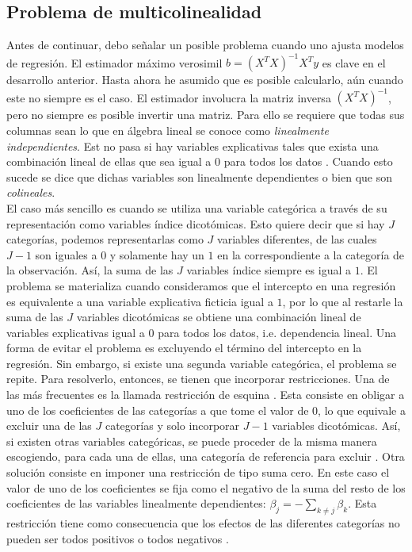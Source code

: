 \subsection{Problema de multicolinealidad}

Antes de continuar, debo señalar un posible problema cuando uno ajusta modelos de regresión. El estimador máximo verosimil $b=(X^TX)^{-1}X^Ty$ es clave en el desarrollo anterior. Hasta ahora he asumido que es posible calcularlo, aún cuando este no siempre es el caso. El estimador involucra la matriz inversa $(X^TX)^{-1}$, pero no siempre es posible invertir una matriz. Para ello se requiere que todas sus columnas sean lo que en álgebra lineal se conoce como \textit{linealmente independientes}. Est no pasa si hay variables explicativas tales que exista una combinación lineal de ellas que sea igual a $0$ para todos los datos \parencite[68]{GelmanHill06}. Cuando esto sucede se dice que dichas variables son linealmente dependientes o bien que son \textit{colineales}.\\

El caso más sencillo es cuando se utiliza una variable categórica a través de su representación como variables índice dicotómicas. Esto quiere decir que si hay $J$ categorías, podemos representarlas como $J$ variables diferentes, de las cuales $J-1$ son iguales a $0$ y solamente hay un $1$ en la correspondiente a la categoría de la observación. Así, la suma de las $J$ variables índice siempre es igual a $1$. El problema se materializa cuando consideramos que el intercepto en una regresión es equivalente a una variable explicativa ficticia igual a $1$, por lo que al restarle la suma de las $J$ variables dicotómicas se obtiene una combinación lineal de variables explicativas igual a $0$ para todos los datos, i.e. dependencia lineal. Una forma de evitar el problema es excluyendo el término del intercepto en la regresión. Sin embargo, si existe una segunda variable categórica, el problema se repite. Para resolverlo, entonces, se tienen que incorporar restricciones. Una de las más frecuentes es la llamada restricción de esquina \parencite[63]{Regueiro12}. Esta consiste en obligar a uno de los coeficientes de las categorías a que tome el valor de $0$, lo que equivale a excluir una de las $J$ categorías y solo incorporar $J-1$ variables dicotómicas. Así, si existen otras variables categóricas, se puede proceder de la misma manera escogiendo, para cada una de ellas, una categoría de referencia para excluir \parencite[68]{GelmanHill06}. Otra solución consiste en imponer una restricción de tipo suma cero. En este caso el valor de uno de los coeficientes se fija como el negativo de la suma del resto de los coeficientes de las variables linealmente dependientes: $\beta_j=-\sum\limits_{k\neq j}\beta_k$. Esta restricción tiene como consecuencia que los efectos de las diferentes categorías no pueden ser todos positivos o todos negativos \parencite[62]{Usi14}.\\

